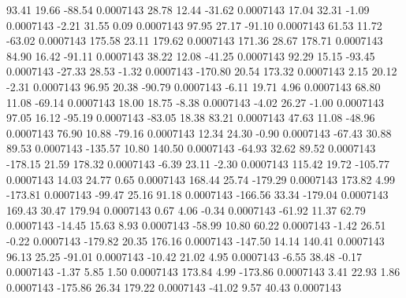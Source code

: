        93.41       19.66      -88.54     0.0007143
       28.78       12.44      -31.62     0.0007143
       17.04       32.31       -1.09     0.0007143
       -2.21       31.55        0.09     0.0007143
       97.95       27.17      -91.10     0.0007143
       61.53       11.72      -63.02     0.0007143
      175.58       23.11      179.62     0.0007143
      171.36       28.67      178.71     0.0007143
       84.90       16.42      -91.11     0.0007143
       38.22       12.08      -41.25     0.0007143
       92.29       15.15      -93.45     0.0007143
      -27.33       28.53       -1.32     0.0007143
     -170.80       20.54      173.32     0.0007143
        2.15       20.12       -2.31     0.0007143
       96.95       20.38      -90.79     0.0007143
       -6.11       19.71        4.96     0.0007143
       68.80       11.08      -69.14     0.0007143
       18.00       18.75       -8.38     0.0007143
       -4.02       26.27       -1.00     0.0007143
       97.05       16.12      -95.19     0.0007143
      -83.05       18.38       83.21     0.0007143
       47.63       11.08      -48.96     0.0007143
       76.90       10.88      -79.16     0.0007143
       12.34       24.30       -0.90     0.0007143
      -67.43       30.88       89.53     0.0007143
     -135.57       10.80      140.50     0.0007143
      -64.93       32.62       89.52     0.0007143
     -178.15       21.59      178.32     0.0007143
       -6.39       23.11       -2.30     0.0007143
      115.42       19.72     -105.77     0.0007143
       14.03       24.77        0.65     0.0007143
      168.44       25.74     -179.29     0.0007143
      173.82        4.99     -173.81     0.0007143
      -99.47       25.16       91.18     0.0007143
     -166.56       33.34     -179.04     0.0007143
      169.43       30.47      179.94     0.0007143
        0.67        4.06       -0.34     0.0007143
      -61.92       11.37       62.79     0.0007143
      -14.45       15.63        8.93     0.0007143
      -58.99       10.80       60.22     0.0007143
       -1.42       26.51       -0.22     0.0007143
     -179.82       20.35      176.16     0.0007143
     -147.50       14.14      140.41     0.0007143
       96.13       25.25      -91.01     0.0007143
      -10.42       21.02        4.95     0.0007143
       -6.55       38.48       -0.17     0.0007143
       -1.37        5.85        1.50     0.0007143
      173.84        4.99     -173.86     0.0007143
        3.41       22.93        1.86     0.0007143
     -175.86       26.34      179.22     0.0007143
      -41.02        9.57       40.43     0.0007143
